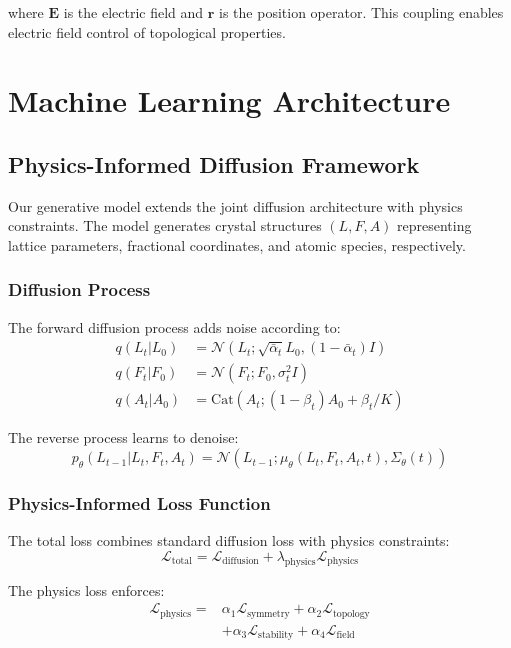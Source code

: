 \documentclass[12pt,a4paper]{article}
\begin{document}
where $\mathbf{E}$ is the electric field and $\mathbf{r}$ is the position operator. This coupling enables electric field control of topological properties.

\section{Machine Learning Architecture}

\subsection{Physics-Informed Diffusion Framework}

Our generative model extends the joint diffusion architecture with physics constraints. The model generates crystal structures $(L, F, A)$ representing lattice parameters, fractional coordinates, and atomic species, respectively.

\subsubsection{Diffusion Process}

The forward diffusion process adds noise according to:
\begin{align}
q(L_t|L_0) &= \mathcal{N}(L_t; \sqrt{\bar{\alpha}_t}L_0, (1-\bar{\alpha}_t)I) \\
q(F_t|F_0) &= \mathcal{N}(F_t; F_0, \sigma_t^2 I) \\
q(A_t|A_0) &= \text{Cat}(A_t; (1-\beta_t)A_0 + \beta_t/K)
\end{align}

The reverse process learns to denoise:
\begin{equation}
p_\theta(L_{t-1}|L_t, F_t, A_t) = \mathcal{N}(L_{t-1}; \mu_\theta(L_t, F_t, A_t, t), \Sigma_\theta(t))
\end{equation}

\subsubsection{Physics-Informed Loss Function}

The total loss combines standard diffusion loss with physics constraints:
\begin{equation}
\mathcal{L}_{\text{total}} = \mathcal{L}_{\text{diffusion}} + \lambda_{\text{physics}} \mathcal{L}_{\text{physics}}
\end{equation}

The physics loss enforces:
\begin{align}
\mathcal{L}_{\text{physics}} = &\alpha_1 \mathcal{L}_{\text{symmetry}} + \alpha_2 \mathcal{L}_{\text{topology}} \\
&+ \alpha_3 \mathcal{L}_{\text{stability}} + \alpha_4 \mathcal{L}_{\text{field}}
\end{align}
\end{document}
